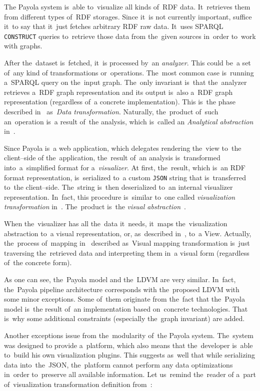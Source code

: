 The Payola system is~able to~visualize all kinds of~RDF data. It~retrieves them from different
types of~RDF storages. Since it~is not currently important, suffice it~to say that it~just fetches
arbitrary RDF raw data. It~uses SPARQL \texttt{CONSTRUCT} queries to~retrieve those data from
the~given sources in~order to~work with graphs.

After the~dataset is~fetched, it~is processed by~an \emph{analyzer}. This could be~a set of~any kind
of transformations or~operations. The~most common case is~running a~SPARQL query
on the~input graph. The~only invariant is~that the~analyzer retrieves a~RDF graph
representation and its output is~also a~RDF graph representation (regardless of~a concrete
implementation). This is~the phase described in~\cite{ldvm} as~\emph{Data transformation}.
Naturally, the~product of~such an~operation is~a result of~the analysis, which is~called an
\emph{Analytical abstraction} in~\cite{ldvm}.

Since Payola is~a web application, which delegates rendering the~view to~the client--side
of the~application, the~result of~an analysis is~transformed into~a~simplified format for a~\emph{visualizer}.
At first, the~result, which is~an RDF format representation, is~serialized to~a custom \texttt{JSON} string
that is~transferred to~the client--side. The~string is~then deserialized to~an internal visualizer
representation. In~fact, this procedure is~similar to~one called \emph{visualization transformation}
in~\cite{ldvm}. The~product is~the \emph{visual abstraction}~\cite{ldvm}.

When the~visualizer has all the~data it~needs, it~maps the~visualization abstraction to~a visual
representation, or, as~described in~\cite{ldvm}, to~a View. Actually, the~process of~mapping in~\cite{ldvm}
described as~Visual mapping transformation is~just traversing the~retrieved data and interpreting
them in~a visual form (regardless of~the concrete form).

As one can see, the~Payola model and the~LDVM are very similar. In~fact, the~Payola pipeline
architecture corresponds with the~proposed LDVM with some minor exceptions. Some of~them
originate from the~fact that the~Payola model is~the result of~an implementation
based on~concrete technologies. That is~why some additional constraints (especially
the~graph invariant) are added.

Another exceptions issue from the~modularity of~the Payola system. The~system was designed
to provide a~platform, which also means that the~developer is~able to~build his own visualization 
plugins. This suggests as~well that while serializing data into~the~JSON, the~platform cannot perform
any data optimizations in~order to~preserve all available information. Let us~remind the~reader of
a~part of~visualization transformation definition from~\cite{ldvm}:

